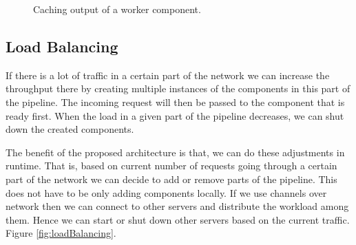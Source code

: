 \documentclass[12pt,a4paper]{article}
\begin{document}
\begin{figure}[h]
\centering
{}\caption[scale=1.0]{Caching output of a worker component.}
\label{fig:caching}
\end{figure}

\subsection{Load Balancing}
If there is a lot of traffic in a certain part of the network we can
increase the throughput there
by creating multiple instances of the components in this part of 
the pipeline. The incoming request will then be passed to the component that is 
ready first. When the load in a given part of the pipeline decreases,
we can shut down the created components.

The benefit of the proposed architecture is that, we can do these adjustments
in runtime.
That is, based on current number of requests going through a certain part of 
the network we can decide to add or remove parts of the pipeline. This does not
have to be only adding components locally.
If we use channels over network then
we can connect to other servers and distribute the workload among them.
Hence we can start or shut down other servers based on the current traffic.
    Figure \ref{fig:loadBalancing}.
\end{document}
